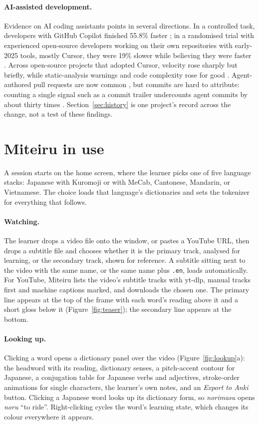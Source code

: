 ﻿\documentclass[11pt,a4paper]{article}
\begin{document}
\paragraph{AI-assisted development.}
Evidence on AI coding assistants points in several directions. In a controlled task, developers with GitHub Copilot finished 55.8\% faster \citep{peng2023impact}; in a randomised trial with experienced open-source developers working on their own repositories with early-2025 tools, mostly Cursor, they were 19\% slower while believing they were faster \citep{becker2025measuring}. Across open-source projects that adopted Cursor, velocity rose sharply but briefly, while static-analysis warnings and code complexity rose for good \citep{he2026speed}. Agent-authored pull requests are now common \citep{li2026aidev,watanabe2026agentic}, but commits are hard to attribute: counting a single signal such as a commit trailer undercounts agent commits by about thirty times \citep{khosravani2026detecting}. Section~\ref{sec:history} is one project's record across the change, not a test of these findings.

\section{Miteiru in use}
\label{sec:walkthrough}

A session starts on the home screen, where the learner picks one of five language stacks: Japanese with Kuromoji or with MeCab, Cantonese, Mandarin, or Vietnamese. The choice loads that language's dictionaries and sets the tokenizer for everything that follows.

\paragraph{Watching.}
The learner drops a video file onto the window, or pastes a YouTube URL, then drops a subtitle file and chooses whether it is the primary track, analysed for learning, or the secondary track, shown for reference. A subtitle sitting next to the video with the same name, or the same name plus \texttt{.en}, loads automatically. For YouTube, Miteiru lists the video's subtitle tracks with yt-dlp, manual tracks first and machine captions marked, and downloads the chosen one. The primary line appears at the top of the frame with each word's reading above it and a short gloss below it (Figure~\ref{fig:teaser}); the secondary line appears at the bottom.

\paragraph{Looking up.}
Clicking a word opens a dictionary panel over the video (Figure~\ref{fig:lookup}a): the headword with its reading, dictionary senses, a pitch-accent contour for Japanese, a conjugation table for Japanese verbs and adjectives, stroke-order animations for single characters, the learner's own notes, and an \emph{Export to Anki} button. Clicking a Japanese word looks up its dictionary form, so \emph{norimasu} opens \emph{noru} ``to ride''. Right-clicking cycles the word's learning state, which changes its colour everywhere it appears.
\end{document}
